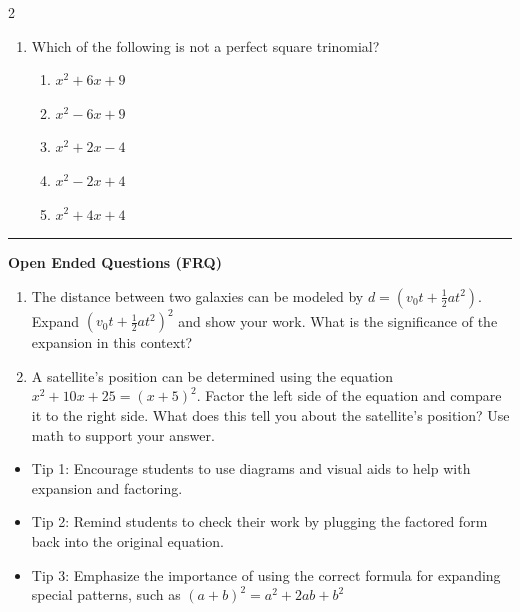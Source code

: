 \documentclass[10pt]{article}
\begin{document}
\begin{multicols}{2}
\begin{enumerate}[label=\textbf{Q\arabic*.}, leftmargin=*, itemsep=6pt, parsep=0pt]
  \item \small Which of the following is not a perfect square trinomial?
  \begin{enumerate}[label=(\Alph*), leftmargin=0.6cm, nosep, itemsep=2pt]
    \item $x^2 + 6x + 9$
    \item $x^2 - 6x + 9$
    \item $x^2 + 2x - 4$
    \item $x^2 - 2x + 4$
    \item $x^2 + 4x + 4$
  \end{enumerate}

\end{enumerate}
\end{multicols}

\vspace{-0.2cm}
\hrule
\vspace{0.2cm}
\textbf{\small Open Ended Questions (FRQ)}
\begin{enumerate}[label=\textbf{Q\arabic*.}, start=9, itemsep=5pt, topsep=0pt]

  \item \small The distance between two galaxies can be modeled by $d = (v_0t + \frac{1}{2}at^2)$. Expand $(v_0t + \frac{1}{2}at^2)^2$ and show your work. What is the significance of the expansion in this context? \vspace{2cm}

  \item \small A satellite's position can be determined using the equation $x^2 + 10x + 25 = (x + 5)^2$. Factor the left side of the equation and compare it to the right side. What does this tell you about the satellite's position? Use math to support your answer. \vspace{2cm}

\end{enumerate}

\vfill

\begin{tcolorbox}[colback=blue!5, colframe=mainblue!50, title=\small \textbf{Chef's Tips}, fonttitle=\bfseries, bottom=1mm]
\begin{itemize}[noitemsep, topsep=2pt, leftmargin=0.5cm]
  \item \scriptsize Tip 1: Encourage students to use diagrams and visual aids to help with expansion and factoring.\item \scriptsize Tip 2: Remind students to check their work by plugging the factored form back into the original equation.\item \scriptsize Tip 3: Emphasize the importance of using the correct formula for expanding special patterns, such as $(a+b)^2 = a^2 + 2ab + b^2$
\end{itemize}
\end{tcolorbox}
\end{document}
